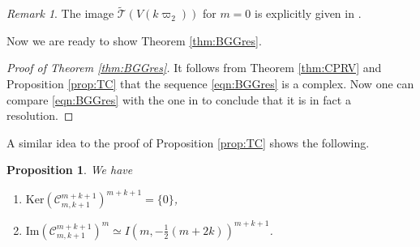 \documentclass[reqno,11pt]{amsart}
\newtheorem{prop}[equation]{Proposition}
\theoremstyle{remark}
\newtheorem{rem}[equation]{Remark}
\numberwithin{equation}{section}
\newcommand{\Cal}{\mathcal}
\renewcommand{\Im}{\mathrm{Im}}
\newcommand{\wT}{\widetilde{\Cal{T}}}
\newcommand{\Ker}{\mathrm{Ker}}
\begin{document}
\begin{rem}
The image $\wT(V(k \varpi_2))$ for $m=0$ is explicitly given
 in \cite[Prop.\ 8.5]{Kubo24+}.
\end{rem}

Now we are ready to show Theorem \ref{thm:BGGres}.

\begin{proof}[Proof of Theorem \ref{thm:BGGres}]
It follows from Theorem \ref{thm:CPRV} and Proposition \ref{prop:TC} that
the sequence \eqref{eqn:BGGres} is a complex. Now one can compare 
\eqref{eqn:BGGres} with the one in \cite[Sect.\ 4]{EG11} to conclude that 
it is in fact a resolution.
\end{proof}

A similar idea to the proof of Proposition \ref{prop:TC} shows the following.

\begin{prop}\label{prop:KI}
We have
\begin{enumerate}
\item[\emph{(1)}] $\Ker(\Cal{C}^{m+k+1}_{m,k+1})^{m+k+1}=\{0\}$,
\vskip 0.1in

\item[\emph{(2)}] $\Im(\Cal{C}^{m+k+1}_{m,k+1})^{m} 
\simeq I(m, -\tfrac{1}{2}(m+2k))^{m+k+1}$.
\end{enumerate}
\end{prop}
\end{document}
